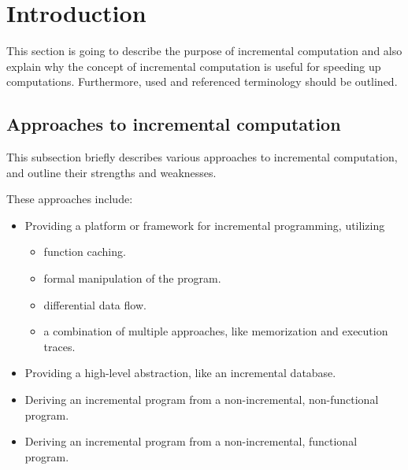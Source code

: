 \section{Introduction}
This section is going to describe the purpose of incremental computation and also explain why the concept of incremental computation is useful for speeding up computations. Furthermore, used and referenced terminology should be outlined.  

\subsection{Approaches to incremental computation}
This subsection briefly describes various approaches to incremental computation, and outline their strengths and weaknesses. 

These approaches include: 
\begin{itemize}
\item Providing a platform or framework for incremental programming, utilizing
\begin{itemize}
\item function caching. \cite{heydon2000caching} \cite{Pugh1989} 
\item formal manipulation of the program. \cite{cohen1991dynamic}
\item differential data flow. \cite{naiadIncremental}
\item a combination of multiple approaches, like memorization and execution traces.  \cite{Hammer2009} \cite{Chen2014} \cite{Acar2008} \cite{acar2006adaptive}   
\end{itemize}
\item Providing a high-level abstraction, like an incremental database. \cite{Peng2010}
\item Deriving an incremental program from a non-incremental, non-functional program. \cite{liu1995systematic} 
\item Deriving an incremental program from a non-incremental, functional program. \cite{ley2008compiling} 
\end{itemize}

